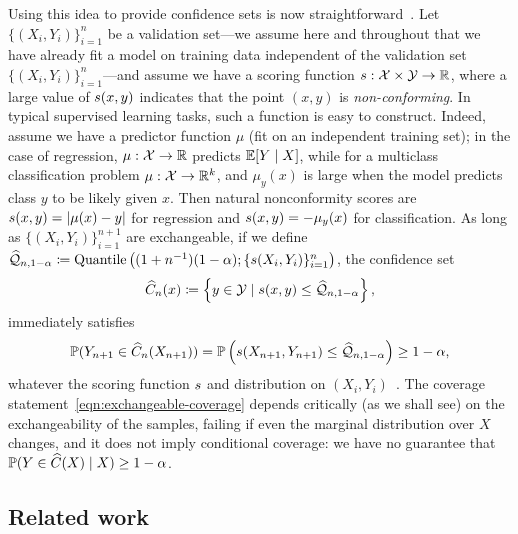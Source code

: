 Using this idea to provide confidence sets is now
straightforward~\cite{VovkGaSh05, LeiGSRiTiWa18}.  Let $\{ (X_i, Y_i)
\}_{i=1}^n$ be a validation set---we assume here and throughout that we have
already fit a model on training data independent of the validation set
$\{(X_i, Y_i)\}_{i=1}^n$---and assume we have a scoring function $s :
\mathcal{X} \times \mathcal{Y} \to \mathbb{R}$, where a large value of $s(x, y)$
indicates that the point $(x, y)$ is \emph{non-conforming}. In typical
supervised learning tasks, such a function is easy to construct. Indeed,
assume we have a predictor function $\mu$ (fit on an independent training
set); in the case of regression, $\mu : \mathcal{X} \to \mathbb{R}$ predicts $\mathbb{E}[Y \mid
  X]$, while for a multiclass classification problem $\mu : \mathcal{X} \to
\mathbb{R}^k$, and $\mu_y(x)$ is large when the model predicts class $y$ to be
likely given $x$. Then natural nonconformity scores are $s(x, y) =
|\mu(x) - y|$ for regression and $s(x, y) = -\mu_y(x)$ for
classification. As long as $\{(X_i, Y_i)\}_{i=1}^{n+1}$ are
exchangeable, if we define $\widehat{\mathcal{Q}}_{n,1-\alpha} \coloneqq
\textup{Quantile}\left((1 + n^{-1})(1- \alpha); \{s(X_i, Y_i)\}_{i=1}^n\right)$,
the confidence set
\begin{equation}
  \label{eqn:confidence-set}
  \widehat{C}_n(x) \coloneqq \left\{y \in \mathcal{Y} \mid s(x, y) \le
 \widehat{\mathcal{Q}}_{n,1-\alpha}
  \right\},
\end{equation}
immediately satisfies
\begin{equation}
 \mathbb{P}(Y_{n + 1} \in \widehat{C}_n(X_{n+1}))
    = \mathbb{P}\left(s(X_{n+1}, Y_{n+1}) \le
   \widehat{\mathcal{Q}}_{n,1-\alpha}
    \right) \ge 1 - \alpha,
 \label{eqn:exchangeable-coverage}
\end{equation}
whatever the scoring function $s$ and distribution on $(X_i,
Y_i)$~\cite{VovkGaSh05, LeiGSRiTiWa18}.  The coverage
statement~\eqref{eqn:exchangeable-coverage} depends critically (as we shall
see) on the exchangeability of the samples, failing if even the marginal
distribution over $X$ changes, and it does not imply conditional coverage:
we have no guarantee that $\mathbb{P}(Y \in \widehat{C}(X) \mid X) \ge 1 - \alpha$.

\subsection{Related work}
\label{sec:related}

